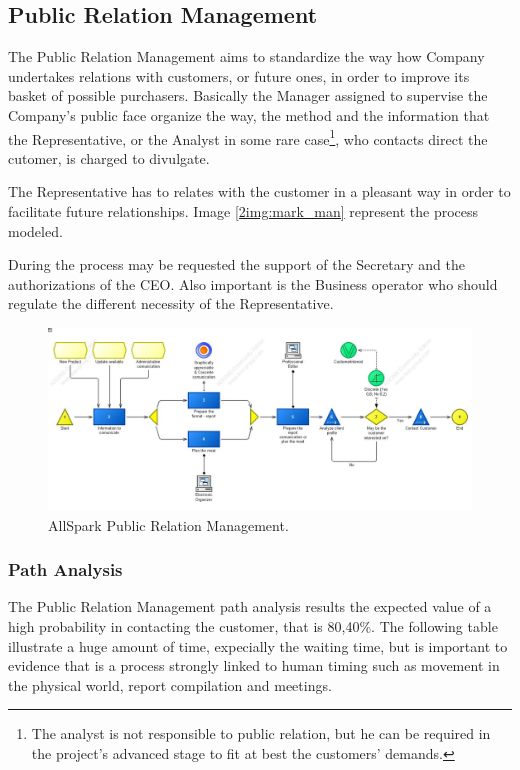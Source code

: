 %

\subsection{Public Relation Management}
The Public Relation Management aims to standardize the way how Company undertakes relations with customers, or future ones, in order to improve its  basket of possible purchasers. Basically the Manager assigned to supervise the Company's public face organize the way, the method and the information that the Representative, or the Analyst in some rare case\footnote{The analyst is not responsible to public relation, but he can be required in the project's advanced stage to fit at best the customers' demands.}, who contacts direct the cutomer, is charged to divulgate. 

The Representative has to relates with the customer in a pleasant way in order to facilitate future relationships. Image \ref{2img:mark_man} represent the process modeled.

During the process may be requested the support of the Secretary and the authorizations of the CEO. Also important is the Business operator who should regulate the different necessity of the Representative.

\begin{figure}[ht!]
\begin{centering}
\includegraphics[scale=0.50, angle=90]{assign2/adonis/imgs/pr_man.jpg}
\caption{AllSpark Public Relation Management.}
\label{2img:pr_man}
\end{centering}
\end{figure}


\subsubsection{Path Analysis}
The Public Relation Management path analysis results the expected value of a high probability in contacting the customer, that is 80,40\%. The following table illustrate a huge amount of time, expecially the waiting time, but is important to evidence that is a process strongly linked to human timing such as movement in the physical world, report compilation and meetings.

